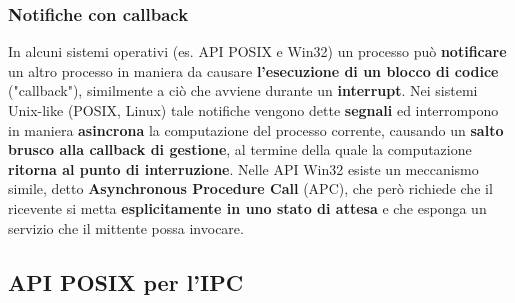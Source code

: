 \documentclass[12pt]{article}
\begin{document}
\subsubsection{Notifiche con callback}
In alcuni sistemi operativi (es. API POSIX e Win32) un processo può \textbf{notificare} un altro processo in maniera da causare \textbf{l'esecuzione di un blocco di codice} ("callback"), similmente a 
ciò che avviene durante un \textbf{interrupt}.
Nei sistemi Unix-like (POSIX, Linux) tale notifiche vengono dette \textbf{segnali} ed interrompono in maniera \textbf{asincrona} la computazione del processo corrente,
causando un \textbf{salto brusco alla callback di gestione}, al termine della quale la computazione \textbf{ritorna al punto di interruzione}.
Nelle API Win32 esiste un meccanismo simile, detto \textbf{Asynchronous Procedure Call} (APC), che però richiede che il ricevente si metta \textbf{esplicitamente in uno stato di attesa} e che esponga un servizio che il mittente possa invocare.
\subsection{API POSIX per l'IPC}
\end{document}
